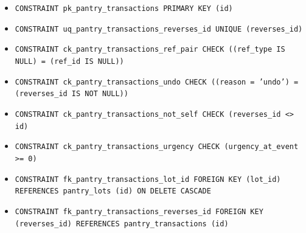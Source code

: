\begin{itemize}
\item \raggedright {\small\texttt{CONSTRAINT pk\_\allowbreak{}\allowbreak{}pantry\_\allowbreak{}\allowbreak{}transactions PRIMARY KEY (id)}}
\item \raggedright {\small\texttt{CONSTRAINT uq\_\allowbreak{}\allowbreak{}pantry\_\allowbreak{}\allowbreak{}transactions\_\allowbreak{}\allowbreak{}reverses\_\allowbreak{}\allowbreak{}id UNIQUE (reverses\_\allowbreak{}\allowbreak{}id)}}
\item \raggedright {\small\texttt{CONSTRAINT ck\_\allowbreak{}\allowbreak{}pantry\_\allowbreak{}\allowbreak{}transactions\_\allowbreak{}\allowbreak{}ref\_\allowbreak{}\allowbreak{}pair CHECK ((ref\_\allowbreak{}\allowbreak{}type IS NULL) = (ref\_\allowbreak{}\allowbreak{}id IS NULL))}}
\item \raggedright {\small\texttt{CONSTRAINT ck\_\allowbreak{}\allowbreak{}pantry\_\allowbreak{}\allowbreak{}transactions\_\allowbreak{}\allowbreak{}undo CHECK ((reason = 'undo') = (reverses\_\allowbreak{}\allowbreak{}id IS NOT NULL))}}
\item \raggedright {\small\texttt{CONSTRAINT ck\_\allowbreak{}\allowbreak{}pantry\_\allowbreak{}\allowbreak{}transactions\_\allowbreak{}\allowbreak{}not\_\allowbreak{}\allowbreak{}self CHECK (reverses\_\allowbreak{}\allowbreak{}id <> id)}}
\item \raggedright {\small\texttt{CONSTRAINT ck\_\allowbreak{}\allowbreak{}pantry\_\allowbreak{}\allowbreak{}transactions\_\allowbreak{}\allowbreak{}urgency CHECK (urgency\_\allowbreak{}\allowbreak{}at\_\allowbreak{}\allowbreak{}event >= 0)}}
\item \raggedright {\small\texttt{CONSTRAINT fk\_\allowbreak{}\allowbreak{}pantry\_\allowbreak{}\allowbreak{}transactions\_\allowbreak{}\allowbreak{}lot\_\allowbreak{}\allowbreak{}id FOREIGN KEY (lot\_\allowbreak{}\allowbreak{}id) REFERENCES pantry\_\allowbreak{}\allowbreak{}lots (id) ON DELETE CASCADE}}
\item \raggedright {\small\texttt{CONSTRAINT fk\_\allowbreak{}\allowbreak{}pantry\_\allowbreak{}\allowbreak{}transactions\_\allowbreak{}\allowbreak{}reverses\_\allowbreak{}\allowbreak{}id FOREIGN KEY (reverses\_\allowbreak{}\allowbreak{}id) REFERENCES pantry\_\allowbreak{}\allowbreak{}transactions (id)}}
\end{itemize}
